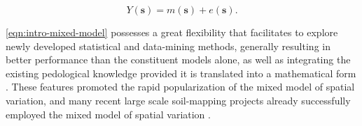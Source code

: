 \begin{equation}\label{eqn:intro-mixed-model}
Y(\boldsymbol{s}) = m(\boldsymbol{s}) + e(\boldsymbol{s}).
\end{equation}

\autoref{eqn:intro-mixed-model} possesses a great flexibility that facilitates to explore newly developed 
statistical and data-mining methods, generally resulting in better performance than the constituent models 
alone, as well as integrating the existing pedological knowledge provided it is translated into a mathematical 
form \cite{OdehEtAl1994, OdehEtAl1995, Heuvelink1996, McBratneyEtAl2000, HenglEtAl2004, Lopez-GranadosEtAl2005, 
WebsterEtAl2007, Grunwald2009, Lark2012}. These features promoted the rapid popularization of the mixed model 
of spatial variation, and many recent large scale soil-mapping projects already successfully employed the mixed 
model of spatial variation \cite{PoggioEtAl2014, NussbaumEtAl2014, HenglEtAl2015}.


